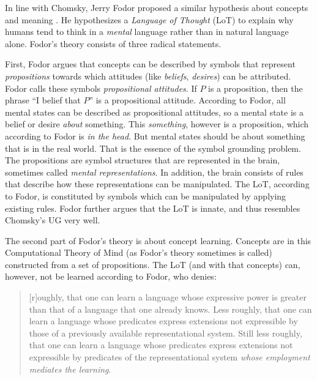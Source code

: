 In line with Chomsky, Jerry Fodor proposed a similar hypothesis about concepts and meaning \cite{fodor:1975}. He hypothesizes a {\em Language of Thought} (LoT) to explain why humans tend to think in a {\em mental} language rather than in natural language alone. Fodor's theory consists of three radical statements.

First, Fodor argues that concepts can be described by symbols that represent {\em propositions} towards which attitudes (like {\em beliefs}, {\em desires}) can be attributed. Fodor calls these symbols {\em propositional attitudes}. If $P$ is a proposition, then the phrase ``I belief that $P$'' is a propositional attitude. According to Fodor, all mental states can be described as propositional attitudes, so a mental state is a belief or desire {\em about} something. This {\em something}, however is a proposition, which according to Fodor is {\em in the head}. But mental states should be about something that is in the real world. That is the essence of the symbol grounding problem. The propositions are symbol structures that are represented in the brain, sometimes called {\em mental representations}. In addition, the brain consists of rules that describe how these representations can be manipulated. The LoT, according to Fodor, is constituted by symbols which can be manipulated by applying existing rules. Fodor further argues that the LoT is innate, and thus resembles Chomsky's UG very well.

The second part of Fodor's theory is about concept learning. Concepts are in this Computational Theory of Mind (as Fodor's theory sometimes is called) constructed from a set of propositions. The LoT (and with that concepts) can, however, not be learned according to Fodor, who denies:


\begin{quote}
[r]oughly, that one can learn a language whose expressive power is greater than that of a language that one already knows. Less roughly, that one can learn a language whose predicates express extensions not expressible by those of a previously available representational system. Still less roughly, that one can learn a language whose predicates express extensions not expressible by predicates of the representational system {\em whose employment mediates the learning}. \cite[p. 86, Fodor's italics]{fodor:1975}
\end{quote}


